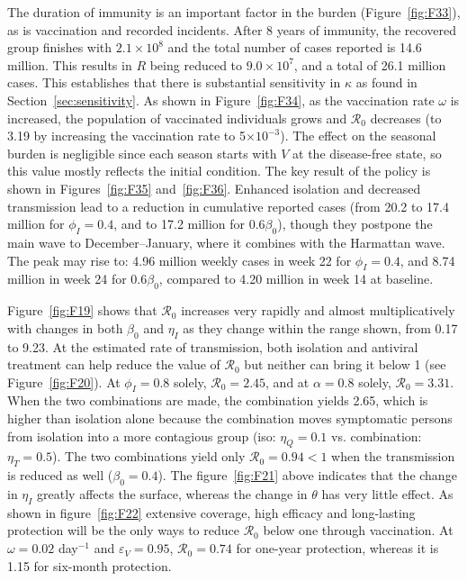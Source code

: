 \documentclass[12pt,a4paper]{article}
\theoremstyle{definition}
\theoremstyle{remark}
\begin{document}
The duration of immunity is an important factor in the burden (Figure~\ref{fig:F33}), as is vaccination and recorded incidents. After 8 years of immunity, the recovered group finishes with $2.1\times10^{8}$ and the total number of cases reported is 14.6 million. This results in $R$ being reduced to $9.0\times10^{7}$, and a total of 26.1 million cases. This establishes that there is substantial sensitivity in $\kappa$ as found in Section~\ref{sec:sensitivity}. As shown in Figure~\ref{fig:F34}, as the vaccination rate $\omega$ is increased, the population of vaccinated individuals grows and $\mathcal{R}_0$ decreases (to 3.19 by increasing the vaccination rate to 5$\times 10^{-3}$). The effect on the seasonal burden is negligible since each season starts with $V$ at the disease-free state, so this value mostly reflects the initial condition. The key result of the policy is shown in Figures~\ref{fig:F35} and~\ref{fig:F36}. Enhanced isolation and decreased transmission lead to a reduction in cumulative reported cases (from 20.2 to 17.4 million for $\phi_I = 0.4$, and to 17.2 million for $0.6\beta_0$), though they postpone the main wave to December–January, where it combines with the Harmattan wave. The peak may rise to: 4.96 million weekly cases in week 22 for $\phi_I = 0.4$, and 8.74 million in week 24 for $0.6\beta_0$, compared to 4.20 million in week 14 at baseline.


Figure~\ref{fig:F19} shows that $\mathcal{R}_0$ increases very rapidly and almost multiplicatively with changes in both $\beta_0$ and $\eta_I$ as they change within the range shown, from 0.17 to 9.23. At the estimated rate of transmission, both isolation and antiviral treatment can help reduce the value of $\mathcal{R}_0$ but neither can bring it below 1 (see Figure~\ref{fig:F20}). At $\phi_I = 0.8$ solely, $\mathcal{R}_0 = 2.45$, and at $\alpha = 0.8$ solely, $\mathcal{R}_0 = 3.31$. When the two combinations are made, the combination yields 2.65, which is higher than isolation alone because the combination moves symptomatic persons from isolation into a more contagious group (iso: $\eta_Q = 0.1$ vs. combination: $\eta_T = 0.5$). The two combinations yield only $\mathcal{R}_0 = 0.94 < 1$ when the transmission is reduced as well ($\beta_0 = 0.4$). The figure~\ref{fig:F21} above indicates that the change in $\eta_I$ greatly affects the surface, whereas the change in $\theta$ has very little effect. As shown in figure~\ref{fig:F22} extensive coverage, high efficacy and long-lasting protection will be the only ways to reduce $\mathcal{R}_0$ below one through vaccination. At $\omega = 0.02$ day$^{-1}$ and $\varepsilon_V = 0.95$, $\mathcal{R}_0 = 0.74$ for one-year protection, whereas it is 1.15 for six-month protection.
\end{document}
